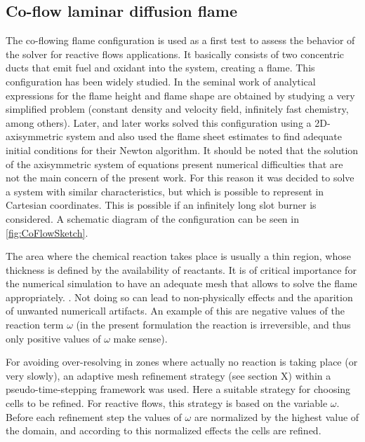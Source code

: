 
\subsection{Co-flow laminar diffusion flame}\label{ssec:coflowFlame}
The co-flowing flame configuration is used as a first test to assess the behavior of the solver for reactive flows applications. It basically consists of two concentric ducts that emit fuel and oxidant into the system, creating a flame. This configuration has been widely studied. In the seminal work of \cite{burkeDiffusionFlames1928} analytical expressions for the flame height and flame shape are obtained by studying a very simplified problem (constant density and velocity field, infinitely fast chemistry, among others). Later, \cite{smookeNumericalModelingAxisymmetric1992} and later works solved this configuration using a 2D-axisymmetric system and also used the flame sheet estimates to find adequate initial conditions for their Newton algorithm. It should be noted that the solution of the axisymmetric system of equations present numerical difficulties that are not the main concern of the present work. For this reason it was decided to solve a system with similar characteristics, but which is possible to represent in Cartesian coordinates. This is possible if an infinitely long slot burner is considered. A schematic diagram of the configuration can be seen in \cref{fig:CoFlowSketch}. 


The area where the chemical reaction takes place is usually a thin region, whose thickness is defined by the availability of reactants. It is of critical importance for the numerical simulation to have an adequate mesh that allows to solve the flame appropriately. . Not doing so can lead to non-physically effects and the aparition of unwanted numericall artifacts. An example of this are negative values of the reaction term $\omega$ (in the present formulation the reaction is irreversible, and thus only positive values of $\omega$ make sense). 

For avoiding over-resolving in zones where actually no reaction is taking place (or very slowly), an adaptive mesh refinement strategy  (see section X) within a pseudo-time-stepping framework was used.  Here a suitable strategy for choosing cells to be refined. For reactive flows, this strategy is based on the variable $\omega$.
Before each refinement step the values of $\omega$ are normalized by the highest value of the domain, and according to this normalized effects the cells are refined. %

